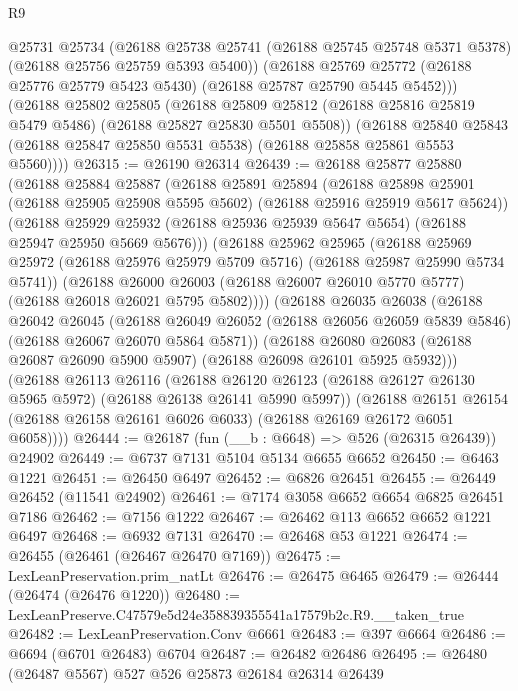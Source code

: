 \begin{lexlean}{R9}
\begin{coremodule}
        @25731
        @25734
        (@26188 @25738 @25741 (@26188 @25745 @25748 @5371 @5378) (@26188 @25756 @25759 @5393 @5400))
        (@26188
          @25769
          @25772
          (@26188 @25776 @25779 @5423 @5430)
          (@26188 @25787 @25790 @5445 @5452)))
      (@26188
        @25802
        @25805
        (@26188 @25809 @25812 (@26188 @25816 @25819 @5479 @5486) (@26188 @25827 @25830 @5501 @5508))
        (@26188
          @25840
          @25843
          (@26188 @25847 @25850 @5531 @5538)
          (@26188 @25858 @25861 @5553 @5560))))
@26315 := @26190 @26314
@26439 := @26188
    @25877
    @25880
    (@26188
      @25884
      @25887
      (@26188
        @25891
        @25894
        (@26188 @25898 @25901 (@26188 @25905 @25908 @5595 @5602) (@26188 @25916 @25919 @5617 @5624))
        (@26188
          @25929
          @25932
          (@26188 @25936 @25939 @5647 @5654)
          (@26188 @25947 @25950 @5669 @5676)))
      (@26188
        @25962
        @25965
        (@26188 @25969 @25972 (@26188 @25976 @25979 @5709 @5716) (@26188 @25987 @25990 @5734 @5741))
        (@26188
          @26000
          @26003
          (@26188 @26007 @26010 @5770 @5777)
          (@26188 @26018 @26021 @5795 @5802))))
    (@26188
      @26035
      @26038
      (@26188
        @26042
        @26045
        (@26188 @26049 @26052 (@26188 @26056 @26059 @5839 @5846) (@26188 @26067 @26070 @5864 @5871))
        (@26188
          @26080
          @26083
          (@26188 @26087 @26090 @5900 @5907)
          (@26188 @26098 @26101 @5925 @5932)))
      (@26188
        @26113
        @26116
        (@26188 @26120 @26123 (@26188 @26127 @26130 @5965 @5972) (@26188 @26138 @26141 @5990 @5997))
        (@26188
          @26151
          @26154
          (@26188 @26158 @26161 @6026 @6033)
          (@26188 @26169 @26172 @6051 @6058))))
@26444 := @26187 (fun (__b : @6648) => @526 (@26315 @26439)) @24902
@26449 := @6737 @7131 @5104 @5134 @6655 @6652
@26450 := @6463 @1221
@26451 := @26450 @6497
@26452 := @6826 @26451
@26455 := @26449 @26452 (@11541 @24902)
@26461 := @7174 @3058 @6652 @6654 @6825 @26451 @7186
@26462 := @7156 @1222
@26467 := @26462 @113 @6652 @6652 @1221 @6497
@26468 := @6932 @7131
@26470 := @26468 @53 @1221
@26474 := @26455 (@26461 (@26467 @26470 @7169))
@26475 := LexLeanPreservation.prim_natLt
@26476 := @26475 @6465
@26479 := @26444 (@26474 (@26476 @1220))
@26480 := LexLeanPreserve.C47579e5d24e358839355541a17579b2c.R9.__taken_true
@26482 := LexLeanPreservation.Conv @6661
@26483 := @397 @6664
@26486 := @6694 (@6701 @26483) @6704
@26487 := @26482 @26486
@26495 := @26480 (@26487 @5567) @527 @526 @25873 @26184 @26314 @26439

\end{coremodule}
\end{lexlean}

